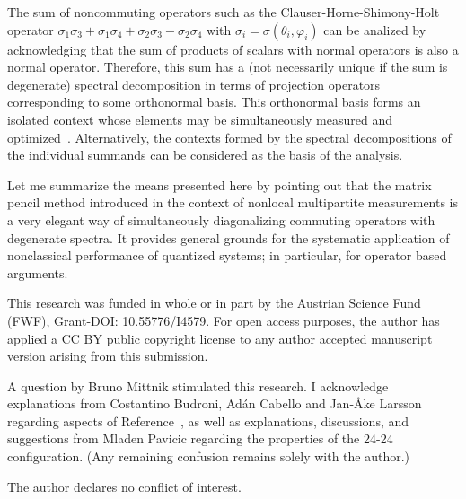 \documentclass[
  twocolumn,
 showpacs,
 showkeys,
 preprintnumbers,
 amsmath,amssymb,
 aps,
 prl,
  longbibliography,
 floatfix,
 ]{revtex4-2}
\newcommand\myotimes{ }
\begin{document}
The sum of noncommuting operators such as the Clauser-Horne-Shimony-Holt operator
$
\sigma_1 \myotimes \sigma_3
+
\sigma_1 \myotimes \sigma_4
+
\sigma_2 \myotimes \sigma_3
-
\sigma_2 \myotimes \sigma_4
$
with
$\sigma_i= \sigma ( \theta_i ,\varphi_i )$
can be analized by acknowledging that the sum of products of scalars with normal operators is also a normal operator.
Therefore, this sum has a (not necessarily unique if the sum is degenerate)
spectral decomposition in terms of projection operators corresponding to some orthonormal basis.
This orthonormal basis forms an isolated context whose elements may be simultaneously measured
and optimized~\cite{filipp-svo-04-qpoly-prl}.
Alternatively, the contexts formed by the spectral decompositions of the individual summands can be considered as the basis of the analysis.

Let me summarize the means presented here by pointing out that the matrix pencil method introduced in the context of nonlocal multipartite measurements is a very elegant way of simultaneously diagonalizing commuting operators with degenerate spectra.
It provides general grounds for the systematic application of nonclassical performance of quantized systems; in particular, for operator based arguments.


\begin{acknowledgments}

This research was funded in whole or in part by the Austrian Science Fund (FWF), Grant-DOI: 10.55776/I4579. For open access purposes, the author has applied a CC BY public copyright license to any author accepted manuscript version arising from this submission.

A question by Bruno Mittnik stimulated this research.
I acknowledge explanations from Costantino Budroni, Ad\'an Cabello and Jan-\AA{}ke Larsson regarding aspects of Reference~\cite{cabello2021contextuality},
as well as explanations, discussions, and suggestions from Mladen Pavicic regarding the properties of the 24-24 configuration.
(Any remaining confusion remains solely with the author.)


The author declares no conflict of interest.
\end{acknowledgments}





\end{document}
